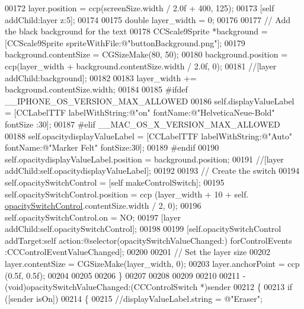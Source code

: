 \begin{DoxyCode}
{{00172     layer.position = ccp(screenSize.width / 2.0f + 400, 125);
00173     [\textcolor{keyword}{self} addChild:layer z:5];
00174     
00175     \textcolor{keywordtype}{double} layer\_width = 0;
00176     
00177     \textcolor{comment}{// Add the black background for the text}
00178     CCScale9Sprite *background  = [CCScale9Sprite spriteWithFile:@"buttonBackground.png"];
00179     background.contentSize      = CGSizeMake(80, 50);
00180     background.position         = ccp(layer\_width + background.contentSize.width / 2.0f, 0);
00181     \textcolor{comment}{//[layer addChild:background];}
00182     
00183     layer\_width += background.contentSize.width;
00184     
00185 \textcolor{preprocessor}{#ifdef \_\_IPHONE\_OS\_VERSION\_MAX\_ALLOWED}
00186 \textcolor{preprocessor}{}    \textcolor{keyword}{self}.displayValueLabel      = [CCLabelTTF labelWithString:@"on" fontName:@"HelveticaNeue-Bold" fontSize
      :30];
00187 \textcolor{preprocessor}{#elif \_\_MAC\_OS\_X\_VERSION\_MAX\_ALLOWED}
00188 \textcolor{preprocessor}{}    \textcolor{keyword}{self}.opacitydisplayValueLabel      = [CCLabelTTF labelWithString:@"Auto" fontName:@"Marker Felt" 
      fontSize:30];
00189 \textcolor{preprocessor}{#endif}
00190 \textcolor{preprocessor}{}    \textcolor{keyword}{self}.opacitydisplayValueLabel.position  = background.position;
00191     \textcolor{comment}{//[layer addChild:self.opacitydisplayValueLabel];}
00192     
00193     \textcolor{comment}{// Create the switch}
00194     \textcolor{keyword}{self}.opacitySwitchControl          = [\textcolor{keyword}{self} makeControlSwitch];
00195     \textcolor{keyword}{self}.opacitySwitchControl.position      = ccp (layer\_width + 10 + \textcolor{keyword}{self}.
      \hyperlink{interface_controls_layer_ad2bbac273b79a99c46e66c61ea66c88b}{opacitySwitchControl}.contentSize.width / 2, 0);
00196     \textcolor{keyword}{self}.opacitySwitchControl.on            = NO;
00197     [layer addChild:self.opacitySwitchControl];
00198     
00199     [\textcolor{keyword}{self}.opacitySwitchControl addTarget:self action:@selector(opacitySwitchValueChanged:) forControlEvents
      :CCControlEventValueChanged];
00200     
00201     \textcolor{comment}{// Set the layer size}
00202     layer.contentSize           = CGSizeMake(layer\_width, 0);
00203     layer.anchorPoint           = ccp (0.5f, 0.5f);
00204     
00205     
00206 \}
00207 
00208 
00209 
00210 
00211 - (void)opacitySwitchValueChanged:(CCControlSwitch *)sender
00212 \{
00213     \textcolor{keywordflow}{if} ([sender isOn])
00214     \{
00215         \textcolor{comment}{//displayValueLabel.string    = @"Eraser";}
}}
\end{DoxyCode}
